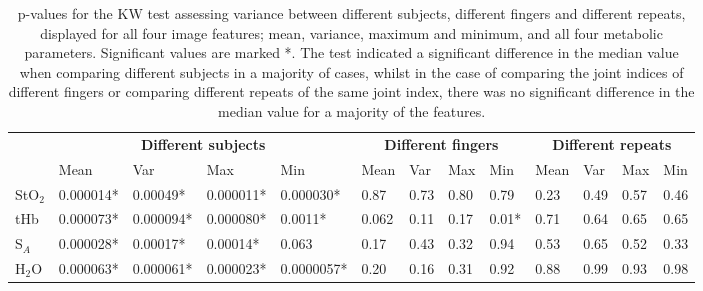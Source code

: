 \documentclass[twoside]{bhamthesis}
\theoremstyle{definition}
\begin{document}
\bgroup
\def\arraystretch{1.4}
\begin{table}[!ht]
\footnotesize
\caption{p-values for the KW test assessing variance between different subjects, different fingers and different repeats, displayed for all four image features; mean, variance, maximum and minimum, and all four metabolic parameters. Significant values are marked *. The test indicated a significant difference in the median value when comparing different subjects in a majority of cases, whilst in the case of comparing the joint indices of different fingers or comparing different repeats of the same joint index, there was no significant difference in the median value for a majority of the features.}
\begin{center}
 \begin{tabular}{|p{0.6cm}|  p{1.4cm} p{1.4cm} p{1.4cm} p{1.4cm}| p{0.6cm} p{0.6cm} p{0.6cm} p{0.6cm}| p{0.5cm} p{0.5cm} p{0.5cm} p{0.5cm}|} 
 \hline 
 & \multicolumn{4}{c|}{\textbf{Different subjects}}  & \multicolumn{4}{c|}{\textbf{Different fingers}} & \multicolumn{4}{c|}{\textbf{Different repeats}}  \\ 
 & Mean & Var & Max & Min & Mean & Var & Max & Min & Mean & Var & Max & Min \\ [1ex] 
 \hline
 StO$_2$ & 0.000014* & 0.00049* & 0.000011* & 0.000030* & 0.87 & 0.73 & 0.80 & 0.79  & 0.23 & 0.49 & 0.57 & 0.46 \\ 
 tHb &  0.000073* & 0.000094* & 0.000080* & 0.0011* & 0.062 & 0.11 & 0.17 & 0.01* & 0.71 & 0.64 & 0.65 & 0.65 \\
 S$_A$ & 0.000028* & 0.00017* & 0.00014* & 0.063  & 0.17 & 0.43 & 0.32 & 0.94 & 0.53 & 0.65 & 0.52 & 0.33 \\
 H$_2$O & 0.000063* & 0.000061* & 0.000023* & 0.0000057*  & 0.20 & 0.16 & 0.31 & 0.92 & 0.88 & 0.99 & 0.93 & 0.98 \\
 \hline
\end{tabular}
\end{center}
\label{Variability_table}
\end{table}
\end{document}
